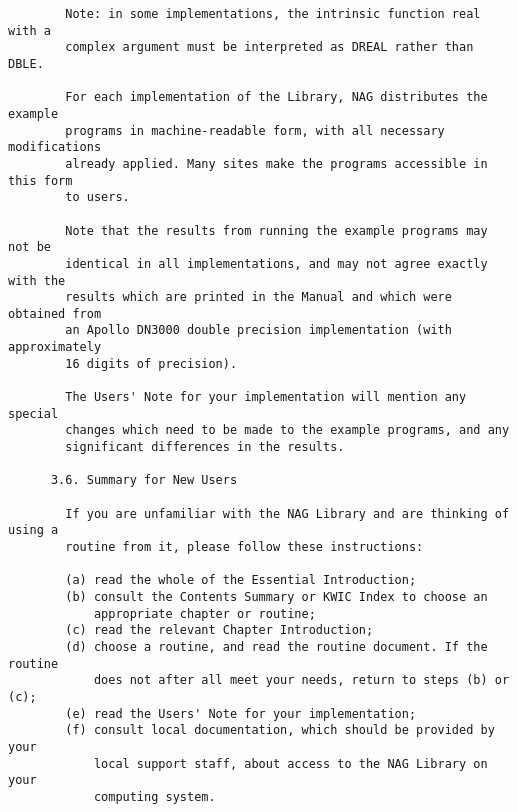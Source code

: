 \begin{small}
\begin{verbatim}
        Note: in some implementations, the intrinsic function real with a         
        complex argument must be interpreted as DREAL rather than DBLE.           
                                                                                  
        For each implementation of the Library, NAG distributes the example       
        programs in machine-readable form, with all necessary modifications       
        already applied. Many sites make the programs accessible in this form     
        to users.                                                                 
                                                                                  
        Note that the results from running the example programs may not be        
        identical in all implementations, and may not agree exactly with the      
        results which are printed in the Manual and which were obtained from      
        an Apollo DN3000 double precision implementation (with approximately      
        16 digits of precision).                                                  
                                                                                  
        The Users' Note for your implementation will mention any special          
        changes which need to be made to the example programs, and any            
        significant differences in the results.                                   
                                                                                  
      3.6. Summary for New Users                                                  
                                                                                  
        If you are unfamiliar with the NAG Library and are thinking of using a    
        routine from it, please follow these instructions:                        
                                                                                  
        (a) read the whole of the Essential Introduction;                         
        (b) consult the Contents Summary or KWIC Index to choose an               
            appropriate chapter or routine;                                       
        (c) read the relevant Chapter Introduction;                               
        (d) choose a routine, and read the routine document. If the routine       
            does not after all meet your needs, return to steps (b) or (c);       
        (e) read the Users' Note for your implementation;                         
        (f) consult local documentation, which should be provided by your         
            local support staff, about access to the NAG Library on your          
            computing system.                                                     
                                                                                  

\end{verbatim}
\end{small}
